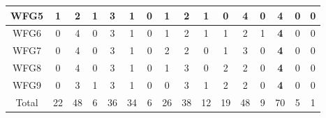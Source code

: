 \begin{table}[h]
{\begin{tabular}{|c|c|c|c|c|c|c|c|c|c|c|c|c|c|c|c|}
WFG5 & 1 & 2 & 1 & 3 & 1 & 0 & 1 & 2 & 1 & 0 & 4 & 0 & \textbf{4} & 0 & 0 \\ \hline
WFG6 & 0 & 4 & 0 & 3 & 1 & 0 & 1 & 2 & 1 & 1 & 2 & 1 & \textbf{4} & 0 & 0 \\ \hline
WFG7 & 0 & 4 & 0 & 3 & 1 & 0 & 2 & 2 & 0 & 1 & 3 & 0 & \textbf{4} & 0 & 0 \\ \hline
WFG8 & 0 & 4 & 0 & 3 & 1 & 0 & 1 & 3 & 0 & 2 & 2 & 0 & \textbf{4} & 0 & 0 \\ \hline
WFG9 & 0 & 3 & 1 & 3 & 1 & 0 & 0 & 3 & 1 & 2 & 2 & 0 & \textbf{4} & 0 & 0 \\ \hline
Total & 22 & 48 & 6 & 36 & 34 & 6 & 26 & 38 & 12 & 19 & 48 & 9 & 70 & 5 & 1 \\ \hline
\end{tabular}%
}
\end{table}

